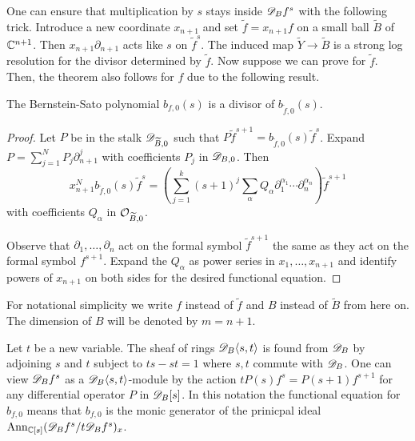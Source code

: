 One can ensure that multiplication by $s$ stays inside $\mathscr{D}_B f^s$ with the following trick.
Introduce a new coordinate $x_{n+1}$ and set $\widetilde{f}= x_{n+1}f$ on a small ball $\widetilde{B}$ of $\mathbb{C}^{n+1}$.
Then $x_{n+1}\partial_{n+1}$ acts like $s$ on $\widetilde{f}^s$.
The induced map $\widetilde{Y} \to \widetilde{B}$ is a strong log resolution for the divisor determined by $\widetilde{f}$.
Now suppose we can prove  for $\widetilde{f}$.
Then, the theorem also follows for $f$ due to the following result.
\begin{lemma}{\cite[Section 3.32]{bjork1979rings}}\label{lem: BernsteinTilde}
  The Bernstein-Sato polynomial $b_{f,0}(s)$ is a divisor of $b_{\widetilde{f},0}(s)$.
\end{lemma}
\begin{proof}
  Let $P$ be in the stalk $\mathscr{D}_{\widetilde{B},0}$ such that $P \widetilde{f}^{s+1} = b_{\widetilde{f},0}(s) \widetilde{f}^s $.
  Expand $P = \sum_{j=1}^N P_j  \partial_{n+1}^{j}$
  with coefficients $P_j$ in $\mathscr{D}_{B,0}$.
  Then
  $$x_{n+1}^N b_{\widetilde{f},0}(s) \widetilde{f}^s = \left(\sum_{j=1}^k (s + 1)^{j} \sum_\alpha Q_{\alpha} \partial_1^{\alpha_1}\cdots \partial_n^{\alpha_n} \right)\widetilde{f}^{s+1}$$
  with coefficients $Q_{\alpha}$ in $\mathcal{O}_{\widetilde{B},0}$.

  Observe that $\partial_1,\ldots, \partial_n$ act on the formal symbol $\widetilde{f}^{s+1}$ the same as they act on the formal symbol $f^{s+1}$.
  Expand the $Q_{\alpha}$ as power series in $x_1,\ldots,x_{n+1}$ and identify powers of $x_{n+1}$ on both sides for the desired functional equation.
\end{proof}
For notational simplicity we write $f$ instead of $\widetilde{f}$ and $B$ instead of $\widetilde{B}$ from here on.
The dimension of $B$ will be denoted by $m=n+1$.

Let $t$ be a new variable.
The sheaf of rings $\mathscr{D}_B\langle s,t\rangle$ is found from $\mathscr{D}_B$ by adjoining $s$ and $t$ subject to $ts -st = 1$ where $s,t$ commute with $\mathscr{D}_B$.
One can view $\mathscr{D}_B f^s$ as a $\mathscr{D}_B\langle s,t\rangle$-module by the action $t P(s)f^s = P(s+1) f^{s+1}$ for any differential operator $P$ in $\mathscr{D}_B[s]$.
In this notation the functional equation for $b_{f,0}$ means that $b_{f,0}$ is the monic generator of the prinicpal ideal $\operatorname{Ann}_{\mathbb{C}[s]} (\mathscr{D}_B f^s / t \mathscr{D}_B f^s)_x$.

